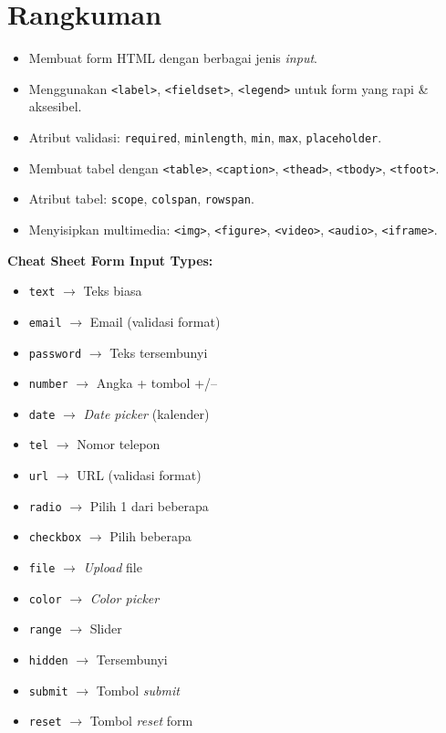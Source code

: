 \section{Rangkuman}
\label{sec:m04-rangkuman}

\begin{itemize}
  \item Membuat form HTML dengan berbagai jenis \emph{input}.
  \item Menggunakan \texttt{<label>}, \texttt{<fieldset>}, \texttt{<legend>} untuk form yang rapi \& aksesibel.
  \item Atribut validasi: \texttt{required}, \texttt{minlength}, \texttt{min}, \texttt{max}, \texttt{placeholder}.
  \item Membuat tabel dengan \texttt{<table>}, \texttt{<caption>}, \texttt{<thead>}, \texttt{<tbody>}, \texttt{<tfoot>}.
  \item Atribut tabel: \texttt{scope}, \texttt{colspan}, \texttt{rowspan}.
  \item Menyisipkan multimedia: \texttt{<img>}, \texttt{<figure>}, \texttt{<video>}, \texttt{<audio>}, \texttt{<iframe>}.
\end{itemize}

\begin{tip}
\textbf{Cheat Sheet Form Input Types:}
\begin{itemize}
  \item \texttt{text} $\rightarrow$ Teks biasa
  \item \texttt{email} $\rightarrow$ Email (validasi format)
  \item \texttt{password} $\rightarrow$ Teks tersembunyi
  \item \texttt{number} $\rightarrow$ Angka + tombol +/--
  \item \texttt{date} $\rightarrow$ \emph{Date picker} (kalender)
  \item \texttt{tel} $\rightarrow$ Nomor telepon
  \item \texttt{url} $\rightarrow$ URL (validasi format)
  \item \texttt{radio} $\rightarrow$ Pilih 1 dari beberapa
  \item \texttt{checkbox} $\rightarrow$ Pilih beberapa
  \item \texttt{file} $\rightarrow$ \emph{Upload} file
  \item \texttt{color} $\rightarrow$ \emph{Color picker}
  \item \texttt{range} $\rightarrow$ Slider
  \item \texttt{hidden} $\rightarrow$ Tersembunyi
  \item \texttt{submit} $\rightarrow$ Tombol \emph{submit}
  \item \texttt{reset} $\rightarrow$ Tombol \emph{reset} form
\end{itemize}
\end{tip}
